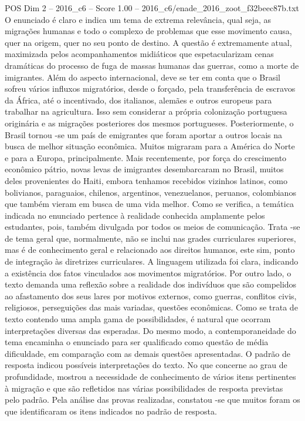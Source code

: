 \begin{textsample}{POS Dim 2 – 2016\_c6 – Score 1.00 – 2016\_c6/enade\_2016\_zoot\_f32beec87b.txt}
O enunciado é claro e indica um tema de extrema relevância, qual seja, as migrações humanas e todo o complexo de problemas que esse movimento causa, quer na origem, quer no seu ponto de destino.
A questão é extremamente atual, maximizada pelos acompanhamentos midiáticos que espetacularizam cenas dramáticas do processo de fuga de massas humanas das guerras, como a morte de imigrantes.
Além do aspecto internacional, deve se ter em conta que o Brasil sofreu vários influxos migratórios, desde o forçado, pela transferência de escravos da África, até o incentivado, dos italianos, alemães e outros europeus para trabalhar na agricultura.
Isso sem considerar a própria colonização portuguesa originária e as migrações posteriores dos mesmos portugueses.
Posteriormente, o Brasil tornou -se um país de emigrantes que foram aportar a outros locais na busca de melhor situação econômica.
Muitos migraram para a América do Norte e para a Europa, principalmente.
Mais recentemente, por força do crescimento econômico pátrio, novas levas de imigrantes desembarcaram no Brasil, muitos deles provenientes do Haiti, embora tenhamos recebidos vizinhos latinos, como bolivianos, paraguaios, chilenos, argentinos, venezuelanos, peruanos, colombianos que também vieram em busca de uma vida melhor.
Como se verifica, a temática indicada no enunciado pertence à realidade conhecida amplamente pelos estudantes, pois, também divulgada por todos os meios de comunicação.
Trata -se de tema geral que, normalmente, não se inclui nas grades curriculares superiores, mas é de conhecimento geral e relacionado aos direitos humanos, este sim, ponto de integração às diretrizes curriculares.
A linguagem utilizada foi clara, indicando a existência dos fatos vinculados aos movimentos migratórios.
Por outro lado, o texto demanda uma reflexão sobre a realidade dos indivíduos que são compelidos ao afastamento dos seus lares por motivos externos, como guerras, conflitos civis, religiosos, perseguições das mais variadas, questões econômicas.
Como se trata de texto contendo uma ampla gama de possibilidades, é natural que ocorram interpretações diversas das esperadas.
Do mesmo modo, a contemporaneidade do tema encaminha o enunciado para ser qualificado como questão de média dificuldade, em comparação com as demais questões apresentadas.
O padrão de resposta indicou possíveis interpretações do texto.
No que concerne ao grau de profundidade, mostrou a necessidade de conhecimento de vários itens pertinentes à migração e que são refletidos nas várias possibilidades de resposta previstas pelo padrão.
Pela análise das provas realizadas, constatou -se que muitos foram os que identificaram os itens indicados no padrão de resposta.

\end{textsample}
